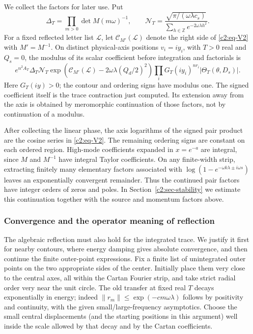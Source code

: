We collect the factors for later use. Put
\[
 \Delta_T=\prod_{m>0}\det M(m\omega)^{-1},\qquad
 \mathcal N_T=
 \frac{\sqrt{\pi/(\omega\lambda c_s)}}
 {\sum_{h\in\mathbb Z}e^{-2\omega\lambda h^2}}.
\]
For a fixed reflected letter list \(\mathcal L\), let
\(\mathcal C_{M'}(\mathcal L)\) denote the right side of
\eqref{c2:eq-V2} with \(M'=M^{-1}\). On distinct physical-axis
positions \(v_i=iy_i\), with \(T>0\) real and \(Q_s=0\), the modulus
of its scalar coefficient before integration and factorials is
\[
 e^{n^2A_T}\Delta_T\mathcal N_T
 \exp\!\left(\mathcal C_{M'}(\mathcal L)
             -2\omega\lambda(Q_d/2)^2\right)
 \prod_i G_T(iy_i)^{nr_i}
 \left|\Theta_T(\theta,D_s)\right|.
\]
Here \(G_T(iy)>0\); the contour and ordering signs have modulus one.
The signed coefficient itself is the trace contraction just computed.
Its extension away from the axis is obtained by meromorphic continuation
of those factors, not by continuation of a modulus.

After collecting the linear phase, the axis logarithms of the signed
pair product are the cosine series in \eqref{c2:eq-V2}. The remaining
ordering signs are constant on each ordered region. High-mode
coefficients expanded in \(x=e^{-a}\) are integral, since \(M\) and
\(M^{-1}\) have integral Taylor coefficients. On any finite-width
strip, extracting finitely many elementary factors associated with
\(\log(1-e^{-\omega k\lambda\pm i\omega s})\) leaves an exponentially
convergent remainder. Thus the continued pair factors have integer
orders of zeros and poles. In Section~\ref{c2:sec-stability} we estimate
this continuation together with the source and momentum factors above.

\subsubsection{Convergence and the operator meaning of reflection}
The algebraic reflection must also hold for the integrated trace. We justify it first for nearby contours, where energy damping gives absolute convergence, and then continue the finite outer-point expressions. Fix a finite list of unintegrated outer points on the two appropriate sides of the center. Initially place them very close to the central axes, all within the Cartan Fourier strip, and take strict radial order very near the unit circle. The old transfer at fixed real \(T\) decays exponentially in energy; indeed \(\|r_m\|\le \exp(-c m\omega\lambda)\) follows by positivity and continuity, with the given small/large-frequency asymptotics. Choose the small central displacements (and the starting positions in this argument) well inside the scale allowed by that decay and by the Cartan coefficients.

